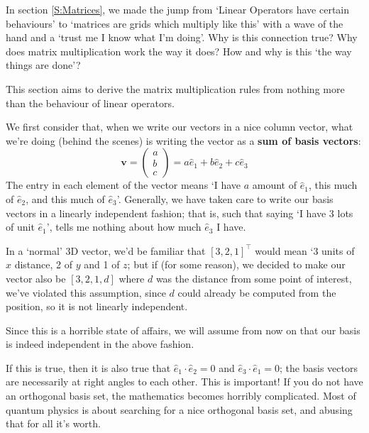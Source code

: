 \documentclass[a4paper,openany,11pt]{book}
\renewcommand\vec[1]{\boldsymbol{\mathbf{#1}}}
\begin{document}
			In section \ref{S:Matrices}, we made the jump from `Linear Operators have certain behaviours' to `matrices are grids which multiply like this' with a wave of the hand and a `trust me I know what I'm doing'.  Why is this connection true? Why does matrix multiplication work the way it does? How and why is this `the way things are done'?

			This section aims to derive the matrix multiplication rules from nothing more than the behaviour of linear operators. 

			We first consider that, when we write our vectors in a nice column vector, what we're doing (behind the scenes) is writing the vector as a \textbf{sum of basis vectors}:
			\begin{equation}
				\vec{v} = \begin{pmatrix}
					a \\ b \\ c
				\end{pmatrix} = a \hat{e}_1 + b \hat{e}_2 + c \hat{e}_3
			\end{equation}
			The entry in each element of the vector means `I have $a$ amount of $\hat{e}_1$, this much of $\hat{e}_2$, and this much of $\hat{e}_3$'. Generally, we have taken care to write our basis vectors in a linearly independent fashion; that is, such that saying `I have 3 lots of unit $\hat{e}_1$', tells me nothing about how much $\hat{e}_3$ I have.

			In a `normal' 3D vector, we'd be familiar that $[3,2,1]^\intercal$ would mean `3 units of $x$ distance, 2 of $y$ and 1 of $z$; but if (for some reason), we decided to make our vector also be $[3,2,1,d]$ where $d$ was the distance from some point of interest, we've violated this assumption, since $d$ could already be computed from the position, so it is not linearly independent.

			Since this is a horrible state of affairs, we will assume from now on that our basis is indeed independent in the above fashion. 

			If this is true, then it is also true that $\hat{e}_1 \cdot \hat{e}_2 = 0$ and $\hat{e}_3 \cdot \hat{e}_1 = 0$; the basis vectors are necessarily at right angles to each other. This is important! If you do not have an orthogonal basis set, the mathematics becomes horribly complicated. Most of quantum physics is about searching for a nice orthogonal basis set, and abusing that for all it's worth. 
\end{document}
